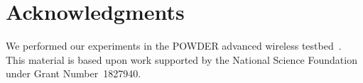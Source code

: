 

\section*{Acknowledgments}
%
%
We performed our experiments in the POWDER advanced wireless
testbed~\cite{powder}.
%
%
This material is based upon work supported by the National Science Foundation
under Grant Number~1827940.


